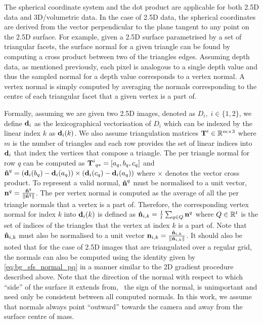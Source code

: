The spherical coordinate system and the dot product are applicable for
both 2.5D data and 3D/volumetric data. In the case of 2.5D data, the spherical
coordinates are derived from the vector perpendicular to the plane tangent
to any point on the 2.5D surface. For example, given a 2.5D surface parametrised
by a set of triangular facets, the surface normal for a given triangle
can be found by computing a cross product between two of the triangles edges.
Assuming depth data, as mentioned previously, each pixel is analogous to a single
depth value and thus the sampled normal for a depth value corresponds to a
vertex normal. A vertex normal is simply computed by averaging the normals
corresponding to the centre of each triangular facet that a given vertex is
a part of.

Formally, assuming we are given two 2.5D images,
denoted as $D_i, \; i \in \{1,2\}$, we define $\boldsymbol{\mathbf{d}}_i$ as the lexicographical
vectorisation of $D_i$ which can be indexed by the linear index $k$ as
$\boldsymbol{\mathbf{d}}_i(k)$. We also assume triangulation matrices
$\boldsymbol{\mathbf{T}}^i \in \mathbb{R}^{m \times 3}$ where $m$ is the number of triangles and each row
provides the set of linear indices into $\boldsymbol{\mathbf{d}}_i$ that index the vertices
that compose a triangle. The per triangle normal for row $q$ can be computed as
${\boldsymbol{\mathbf{T}}^i}_{q\ast} = [a_q, b_q, c_q]$ and
$\boldsymbol{\mathbf{\hat{n}}}^q = ({\boldsymbol{\mathbf{d}}_i(b_q)} - {\boldsymbol{\mathbf{d}}_i(a_q)}) \times ({\boldsymbol{\mathbf{d}}_i(c_q)} - {\boldsymbol{\mathbf{d}}_i(a_q)})$
where $\times$ denotes the vector cross product. To represent a valid normal,
$\boldsymbol{\mathbf{\hat{n}}}^q$ must be normalised to a unit vector,
$\boldsymbol{\mathbf{n}}^q = \frac{\boldsymbol{\mathbf{\hat{n}}}^q}{\lVert{} \boldsymbol{\mathbf{\hat{n}}}^q \rVert}$. The per vertex normal
is computed as the average of all the per triangle normals that a vertex
is a part of. Therefore, the corresponding vertex normal for index $k$ into
$\boldsymbol{\mathbf{d}}_i(k)$ is defined as $\boldsymbol{\mathbf{\hat{n}}}_{i,k} = \frac{1}{t} \sum_{q \in Q} \boldsymbol{\mathbf{n}}^q$
where $Q \in \mathbb{R}^t$ is the set of indices of the triangles that the vertex at index
$k$ is a part of. Note that $\boldsymbol{\mathbf{\hat{n}}}_{i,k}$ must also be normalised to
a unit vector $\boldsymbol{\mathbf{n}}_{i,k} = \frac{\boldsymbol{\mathbf{\hat{n}}}_{i,k}}{\lVert{} \boldsymbol{\mathbf{\hat{n}}}_{i,k} \rVert}$.
It should also be noted that for the case of 2.5D images that are triangulated
over a regular grid, the normals can also be computed using the
identity given by \cref{eq:bg_sfs_normal_pq} in a manner similar to the 2D
gradient procedure described above.
Note that the direction of the  normal with respect to which ``side'' of the
surface it extends from, \eg~the sign of the normal, is unimportant and need
only be consistent between all computed normals. In this work, we assume that
normals always point ``outward'' towards the camera and away from the surface
centre of mass.

